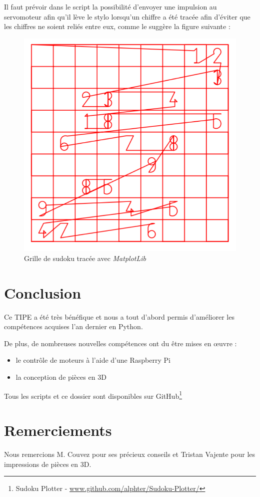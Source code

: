 \documentclass[12pt,a4paper]{report}
\begin{document}
Il faut prévoir dans le script la possibilité d'envoyer une impulsion au servomoteur afin qu'il lève le stylo lorsqu'un chiffre a été tracée afin d'éviter que les chiffres ne soient reliés entre eux, comme le suggère la figure suivante :

\begin{figure}[!h]
 \center
 \includegraphics[scale=0.45]{../pictures/Sudoku_relies}
 \caption{Grille de sudoku tracée avec \emph{MatplotLib}}
\end{figure}

\chapter*{Conclusion}
Ce TIPE a été très bénéfique et nous a tout d'abord permis d'améliorer les compétences acquises l'an dernier en Python.

De plus, de nombreuses nouvelles compétences ont du être mises en œuvre :

\begin{itemize}[label=--]
\item le contrôle de moteurs à l'aide d'une Raspberry Pi
\item la conception de pièces en 3D

\end{itemize}
Tous les scripts et ce dossier sont disponibles sur GitHub\footnote{Sudoku Plotter - \url{www.github.com/alphter/Sudoku-Plotter/}}

\chapter*{Remerciements}

Nous remercions M. Couvez pour ses précieux conseils et Tristan Vajente pour les impressions de pièces en 3D.

%
\end{document}
